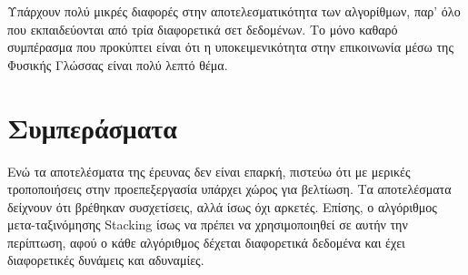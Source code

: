 \documentclass[a4paper, 12pt]{article}
\begin{document}
Υπάρχουν πολύ μικρές διαφορές στην αποτελεσματικότητα των αλγορίθμων, παρ' όλο που εκπαιδεύονται από τρία διαφορετικά σετ δεδομένων. Το μόνο καθαρό συμπέρασμα που προκύπτει είναι ότι η υποκειμενικότητα στην επικοινωνία μέσω της Φυσικής Γλώσσας είναι πολύ λεπτό θέμα.

\section{Συμπεράσματα}

Ενώ τα αποτελέσματα της έρευνας δεν είναι επαρκή, πιστεύω ότι με μερικές τροποποιήσεις στην προεπεξεργασία υπάρχει χώρος για βελτίωση. Τα αποτελέσματα δείχνουν ότι βρέθηκαν συσχετίσεις, αλλά ίσως όχι αρκετές. Επίσης, ο αλγόριθμος μετα-ταξινόμησης Stacking ίσως να πρέπει να χρησιμοποιηθεί σε αυτήν την περίπτωση, αφού ο κάθε αλγόριθμος δέχεται διαφορετικά δεδομένα και έχει διαφορετικές δυνάμεις και αδυναμίες.




\end{document}
